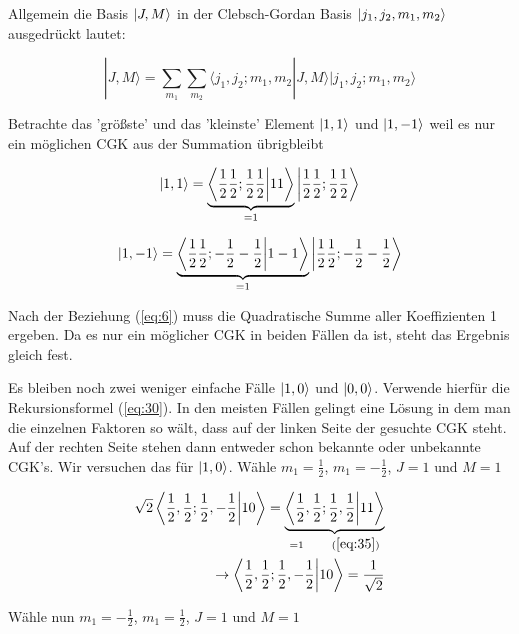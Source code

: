 Allgemein die Basis \(\left| J,M \right\rangle\) in der Clebsch-Gordan Basis \(\left| j_1,j_2,m_1,m_2 \right\rangle\) ausgedrückt lautet:


\begin{equation}
  \label{eq:33}
  |J,M\rangle = \sum_{m_1}\sum_{m_2}\langle j_1,j_2;m_1,m_2|J,M\rangle |j_1,j_2;m_1,m_2\rangle
\end{equation}


Betrachte das 'größste' und das 'kleinste' Element \(\left| 1,1 \right\rangle\) und \(\left| 1,-1 \right\rangle\) weil es nur ein möglichen CGK aus der Summation übrigbleibt


\begin{equation}
  \label{eq:35}
  \ket{1,1} =\underbrace{ \braket{ \frac{1}{2}\frac{1}{2};\frac{1}{2}\frac{1}{2} }{11} }_{=1} \ket{ \frac{1}{2}\frac{1}{2};  \frac{1}{2} \frac{1}{2}}
\end{equation}

\begin{equation}
  \label{eq:36}
    \ket{1,-1} =\underbrace{ \braket{ \frac{1}{2}\frac{1}{2};-\frac{1}{2}-\frac{1}{2} }{1-1} }_{=1} \ket{ \frac{1}{2}\frac{1}{2};  -\frac{1}{2} -\frac{1}{2}}
\end{equation}



Nach der Beziehung (\ref{eq:6}) muss die Quadratische Summe aller Koeffizienten 1 ergeben. Da es nur ein möglicher CGK in beiden Fällen da ist, steht das Ergebnis gleich fest. 

Es bleiben noch zwei weniger einfache Fälle \(\left| 1,0 \right\rangle\) und \(\left| 0,0 \right\rangle\). Verwende hierfür die Rekursionsformel (\ref{eq:30}). In den meisten Fällen gelingt eine Lösung in dem man die einzelnen Faktoren so wält, dass auf der linken Seite der gesuchte CGK steht. Auf der rechten Seite stehen dann entweder schon bekannte oder unbekannte CGK's. Wir versuchen das für \(\left| 1,0 \right\rangle\). Wähle \(m_1=\frac{1}{2}\), \(m_1=-\frac{1}{2}\), \(J=1\) und \(M=1\)

\begin{align}
  \label{eq:34}
  \sqrt{2}\braket{\frac{1}{2},\frac{1}{2};\frac{1}{2},-\frac{1}{2}}{10}= \underbr{ \braket{\frac{1}{2},\frac{1}{2};\frac{1}{2},\frac{1}{2}}{11}}_{=1 \qquad (\ref{eq:35})}  \\
\rightarrow \braket{\frac{1}{2},\frac{1}{2};\frac{1}{2},-\frac{1}{2}}{10}=\frac{1}{\sqrt{2}}
\end{align}

Wähle nun \(m_1=-\frac{1}{2}\), \(m_1=\frac{1}{2}\), \(J=1\) und \(M=1\)




